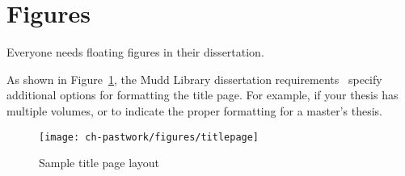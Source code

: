 \section{Figures}
\label{sec:pastwork:figures}

Everyone needs floating figures in their dissertation. 

As shown in Figure~\ref{fig:pastwork:titlepage}, the Mudd Library dissertation requirements~\cite{muddthesis2009} specify additional options for formatting the title page. For example, if your thesis has multiple volumes, or to indicate the proper formatting for a master's thesis.

\begin{figure}[htb]
  \begin{center}
    \texttt{[image: ch-pastwork/figures/titlepage]}
    \caption[Sample Title Page Layout]{Sample title page layout~\cite{muddthesis2009}}
    \label{fig:pastwork:titlepage}
  \end{center}
\end{figure}
